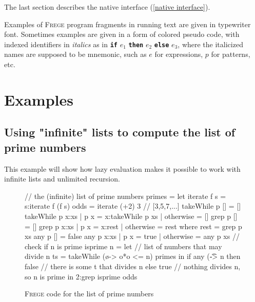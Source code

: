 \documentclass[a4paper,twocolumn,landscape]{report}
\newenvironment{code}[0]{\verbatim}{\endverbatim}
\newcommand{\frege}[0]{\textsc{Frege}}
\newcommand{\qq}[1]{"#1"}
\newcommand{\term}[1]{\textbf{\texttt{\textcolor{trmred}{#1}}}}
\begin{document}
The last section describes  the native interface
(\autoref{native interface}).

Examples of \frege{} program fragments in running text are given in
typewriter font. Sometimes examples are given in a form of
colored pseudo code,
with indexed identifiers in \emph{italics} as in \term{if} $e_1$
\term{then} $e_2$ \term{else} $e_3$, where the  italicized names are
supposed to be mnemonic, such as $e$ for expressions, $p$ for patterns,
etc.






%


\appendix


\chapter{Examples}
\section{Using \qq{infinite} lists to compute the list of prime numbers}
\label{example1}
This example will show how lazy evaluation makes it possible to work
with infinite lists and unlimited recursion.

\begin{figure}[hbt]
\begin{code}
// the (infinite) list of prime numbers
primes = let
          iterate f s = s:iterate f (f s)
          odds = iterate (+2) 3   // [3,5,7,...]
          takeWhile p [] = []
          takeWhile p x:xs
            | p x       = x:takeWhile p xs
            | otherwise = []
          grep p []     = []
          grep p x:xs
            | p x       = x:rest
            | otherwise = rest
            where
                rest = grep p xs
          any p []      = false
          any p x:xs
            | p x       = true
            | otherwise = any p xs
          // check if n is prime
          isprime n = let
            // list of numbers that may divide n
            ts = takeWhile (\o -> o*o <= n) primes
          in if any (\t -> n%
            then false   // there is some t that divides n
            else true    // nothing divides n, so n is prime
    in 2:grep isprime odds
\end{code}
\caption{\frege{} code for the list of prime numbers}
\label{primes}
\end{figure}
\end{document}
